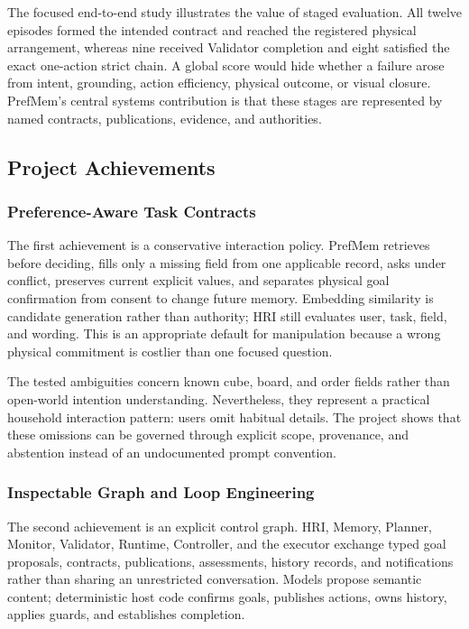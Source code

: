 The focused end-to-end study illustrates the value of staged evaluation. All
twelve episodes formed the intended contract and reached the registered
physical arrangement, whereas nine received Validator completion and eight
satisfied the exact one-action strict chain. A global score would hide whether
a failure arose from intent, grounding, action efficiency, physical outcome, or
visual closure. PrefMem's central systems contribution is that these stages are
represented by named contracts, publications, evidence, and authorities.

\subsection{Project Achievements}
\label{subsec:discussion-achievements}

\subsubsection{Preference-Aware Task Contracts}

The first achievement is a conservative interaction policy. PrefMem retrieves
before deciding, fills only a missing field from one applicable record, asks
under conflict, preserves current explicit values, and separates physical goal
confirmation from consent to change future memory. Embedding similarity is
candidate generation rather than authority; HRI still evaluates user, task,
field, and wording. This is an appropriate default for manipulation because a
wrong physical commitment is costlier than one focused question.

The tested ambiguities concern known cube, board, and order fields rather than
open-world intention understanding. Nevertheless, they represent a practical
household interaction pattern: users omit habitual details. The project shows
that these omissions can be governed through explicit scope, provenance, and
abstention instead of an undocumented prompt convention.

\subsubsection{Inspectable Graph and Loop Engineering}

The second achievement is an explicit control graph. HRI, Memory, Planner,
Monitor, Validator, Runtime, Controller, and the executor exchange typed goal
proposals, contracts, publications, assessments, history records, and
notifications rather than sharing an unrestricted conversation. Models propose
semantic content; deterministic host code confirms goals, publishes actions,
owns history, applies guards, and establishes completion.

